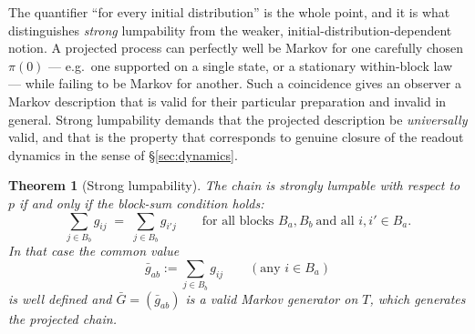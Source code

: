 \documentclass[11pt,reqno]{amsart}
\theoremstyle{plain}
\newtheorem{theorem}{Theorem}[section]
\theoremstyle{definition}
\theoremstyle{remark}
\begin{document}
The quantifier ``for every initial distribution'' is the whole point, and it is what distinguishes \emph{strong} lumpability from the weaker, initial-distribution-dependent notion. A projected process can perfectly well be Markov for one carefully chosen $\pi(0)$ --- e.g.\ one supported on a single state, or a stationary within-block law --- while failing to be Markov for another. Such a coincidence gives an observer a Markov description that is valid for their particular preparation and invalid in general. Strong lumpability demands that the projected description be \emph{universally} valid, and that is the property that corresponds to genuine closure of the readout dynamics in the sense of \S\ref{sec:dynamics}.

\begin{theorem}[Strong lumpability]\label{thm:lumpability}
The chain is strongly lumpable with respect to $p$ if and only if the \emph{block-sum condition} holds:
\begin{equation}\label{eq:blocksum}
\sum_{j\in B_b}g_{ij}\;=\;\sum_{j\in B_b}g_{i'j}
\qquad\text{for all blocks }B_a,B_b\ \text{and all }i,i'\in B_a .
\end{equation}
In that case the common value
\begin{equation}\label{eq:projgen}
\bar g_{ab}:=\sum_{j\in B_b}g_{ij}\qquad(\text{any }i\in B_a)
\end{equation}
is well defined and $\bar G=(\bar g_{ab})$ is a valid Markov generator on $T$, which generates the projected chain.
\end{theorem}
\end{document}
